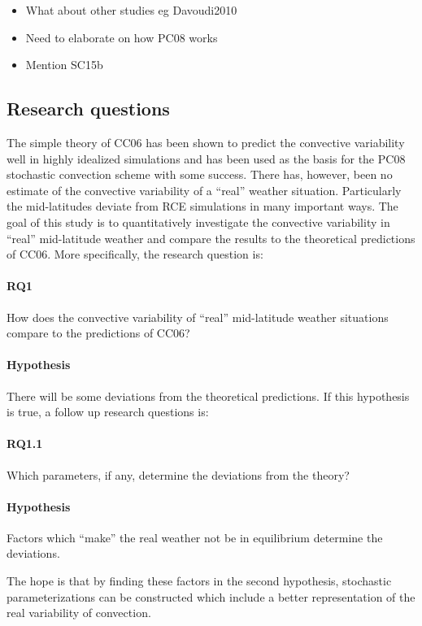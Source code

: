 \documentclass[a4paper, 12pt]{article}
\begin{document}
\begin{itemize}
 \item What about other studies eg Davoudi2010
 \item Need to elaborate on how PC08 works
 \item Mention SC15b
\end{itemize}

\subsection{Research questions}
The simple theory of CC06 has been shown to predict the convective variability well in highly idealized simulations and has been used as the basis for the PC08 stochastic convection scheme with some success. There has, however, been no estimate of the convective variability of a ``real'' weather situation. Particularly the mid-latitudes deviate from RCE simulations in many important ways. The goal of this study is to quantitatively investigate the convective variability in ``real'' mid-latitude weather and compare the results to the theoretical predictions of CC06. More specifically, the research question is:

\paragraph{RQ1} How does the convective variability of ``real'' mid-latitude weather situations compare to the predictions of CC06?
\paragraph{Hypothesis} There will be some deviations from the theoretical predictions. 
If this hypothesis is true, a follow up research questions is:
\paragraph{RQ1.1} Which parameters, if any, determine the deviations from the theory?
\paragraph{Hypothesis} Factors which ``make'' the real weather not be in equilibrium determine the deviations.

The hope is that by finding these factors in the second hypothesis, stochastic parameterizations can be constructed which include a better representation of the real variability of convection. 
\end{document}
